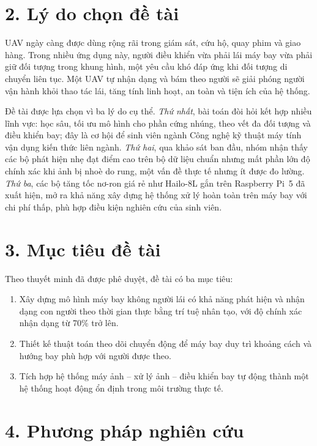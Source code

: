 \section*{2. Lý do chọn đề tài}

UAV ngày càng được dùng rộng rãi trong giám sát, cứu hộ, quay phim và giao hàng. Trong nhiều ứng dụng này, người điều khiển vừa phải lái máy bay vừa phải giữ đối tượng trong khung hình, một yêu cầu khó đáp ứng khi đối tượng di chuyển liên tục. Một UAV tự nhận dạng và bám theo người sẽ giải phóng người vận hành khỏi thao tác lái, tăng tính linh hoạt, an toàn và tiện ích của hệ thống.

Đề tài được lựa chọn vì ba lý do cụ thể. \textit{Thứ nhất}, bài toán đòi hỏi kết hợp nhiều lĩnh vực: học sâu, tối ưu mô hình cho phần cứng nhúng, theo vết đa đối tượng và điều khiển bay; đây là cơ hội để sinh viên ngành Công nghệ kỹ thuật máy tính vận dụng kiến thức liên ngành. \textit{Thứ hai}, qua khảo sát ban đầu, nhóm nhận thấy các bộ phát hiện nhẹ đạt điểm cao trên bộ dữ liệu chuẩn nhưng mất phần lớn độ chính xác khi ảnh bị nhoè do rung, một vấn đề thực tế nhưng ít được đo lường. \textit{Thứ ba}, các bộ tăng tốc nơ-ron giá rẻ như Hailo-8L gắn trên Raspberry Pi~5 đã xuất hiện, mở ra khả năng xây dựng hệ thống xử lý hoàn toàn trên máy bay với chi phí thấp, phù hợp điều kiện nghiên cứu của sinh viên.

\section*{3. Mục tiêu đề tài}

Theo thuyết minh đã được phê duyệt, đề tài có ba mục tiêu:
\begin{enumerate}
\item Xây dựng mô hình máy bay không người lái có khả năng phát hiện và nhận dạng con người theo thời gian thực bằng trí tuệ nhân tạo, với độ chính xác nhận dạng từ 70\% trở lên.
\item Thiết kế thuật toán theo dõi chuyển động để máy bay duy trì khoảng cách và hướng bay phù hợp với người được theo.
\item Tích hợp hệ thống máy ảnh -- xử lý ảnh -- điều khiển bay tự động thành một hệ thống hoạt động ổn định trong môi trường thực tế.
\end{enumerate}

\section*{4. Phương pháp nghiên cứu}


